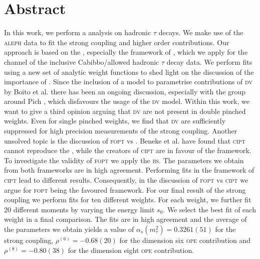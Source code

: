 \documentclass[../../index.tex]{subfiles}
\begin{document}
\chapter*{Abstract}
In this work, we perform a  analysis on
hadronic \(\tau\) decays. We make use of the \textsc{aleph} data to fit
the strong coupling and higher order 
contributions. Our approach is based on the , especially the framework of , which we apply for the  channel
of the inclusive Cabibbo\-/allowed hadronic \(\tau\) decay data. We perform
fits using a new set of analytic weight functions to shed light on the
discussion of the importance of . Since the
inclusion of a model to parametrise contributions of \textsc{dv} by Boito et al.
\cite{Boito2011a} there has been an ongoing discussion, especially with the group
around Pich \cite{Pich2016}, which disfavours the usage of the \textsc{dv}
model. Within this work, we want to give a third opinion arguing that
\textsc{dv} are not present in double pinched weights. Even for single pinched
weights, we find that \textsc{dv} are sufficiently suppressed for high precision
measurements of the strong coupling. Another unsolved topic is the discussion of
\textsc{fopt} vs . Beneke
et al. \cite{Beneke2008} have found that \textsc{cipt} cannot reproduce the
, while the creators of \textsc{cipt}
\cite{Pivovarov1991, LeDiberder1992a} are in favour of the framework. To
investigate the validity of \textsc{fopt} we apply the \textsc{bs}. The
parameters we obtain from both frameworks are in high agreement. Performing fits
in the framework of \textsc{cipt} lead to different results. Consequently, in
the discussion of \textsc{fopt} vs \textsc{cipt} we argue for \textsc{fopt}
being the favoured framework. For our final result of the strong coupling we
perform fits for ten different weights. For each weight, we further fit 20
different moments by varying the energy limit \(s_0\). We select the best fit of
each weight in a final comparison. The fits are in high agreement and the
average of the parameters we obtain yields a value of \(\alpha_s(m_\tau^2) =
0.3261(51) \) for the strong coupling, \(\rho^{(6)} = -0.68(20)\) for the
dimension six \textsc{ope} contribution and \(\rho^{(8)} = -0.80(38) \) for the
dimension eight \textsc{ope} contribution.
\end{document}
